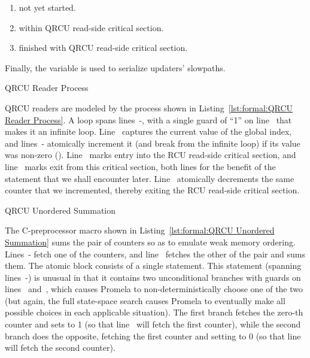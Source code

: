 \begin{enumerate}[label={\arabic*}:,start=0,itemsep=0pt]
\item	not yet started.
\item	within QRCU read-side critical section.
\item	finished with QRCU read-side critical section.
\end{enumerate}

Finally, the  variable is used to serialize updaters' slowpaths.

\begin{listing}[htbp]

\caption{QRCU Reader Process}
\label{lst:formal:QRCU Reader Process}
\end{listing}

\begin{lineref}
QRCU readers are modeled by the  process shown in
Listing~\ref{lst:formal:QRCU Reader Process}.
A  loop spans lines~-,
with a single guard of ``1''
on line~ that makes it an infinite loop.
Line~ captures the current value of the global index,
and lines~-
atomically increment it (and break from the infinite loop)
if its value was non-zero ().
Line~ marks entry into the RCU read-side critical section, and
line~ marks exit from this critical section,
both lines for the benefit of
the  statement that we shall encounter later.
Line~ atomically decrements the same counter that we incremented,
thereby exiting the RCU read-side critical section.
\end{lineref}

\begin{listing}[htbp]

\caption{QRCU Unordered Summation}
\label{lst:formal:QRCU Unordered Summation}
\end{listing}

\begin{lineref}
The C-preprocessor macro shown in
Listing~\ref{lst:formal:QRCU Unordered Summation}
sums the pair of counters so as to emulate weak memory ordering.
Lines~- fetch one of the counters,
and line~ fetches the other
of the pair and sums them.
The atomic block consists of a single  statement.
This  statement (spanning lines~-) is unusual in that
it contains two unconditional
branches with guards on lines~ and~, which causes Promela to
non-deterministically choose one of the two (but again, the full
state-space search causes Promela to eventually make all possible
choices in each applicable situation).
The first branch fetches the zero-th counter and sets  to 1 (so
that line~ will fetch the first counter), while the second
branch does the opposite, fetching the first counter and setting 
to 0 (so that line~ will fetch the second counter).
\end{lineref}

